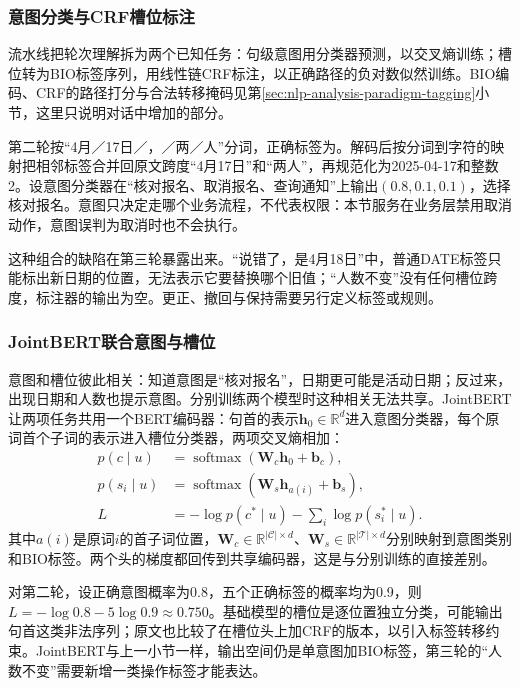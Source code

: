 \subsubsection{意图分类与CRF槽位标注}
\label{sec:nlp-dialogue-intent-crf}

流水线把轮次理解拆为两个已知任务：句级意图用分类器预测，以交叉熵训练；槽位转为BIO标签序列，用线性链CRF标注，以正确路径的负对数似然训练。BIO编码、CRF的路径打分与合法转移掩码见第\ref{sec:nlp-analysis-paradigm-tagging}小节，这里只说明对话中增加的部分。

第二轮按“4月／17日／，／两／人”分词，正确标签为。解码后按分词到字符的映射把相邻标签合并回原文跨度“4月17日”和“两人”，再规范化为2025-04-17和整数2。设意图分类器在“核对报名、取消报名、查询通知”上输出$(0.8,0.1,0.1)$，选择核对报名。意图只决定走哪个业务流程，不代表权限：本节服务在业务层禁用取消动作，意图误判为取消时也不会执行。

这种组合的缺陷在第三轮暴露出来。“说错了，是4月18日”中，普通DATE标签只能标出新日期的位置，无法表示它要替换哪个旧值；“人数不变”没有任何槽位跨度，标注器的输出为空。更正、撤回与保持需要另行定义标签或规则。

\subsubsection{JointBERT联合意图与槽位}
\label{sec:nlp-dialogue-jointbert}

意图和槽位彼此相关：知道意图是“核对报名”，日期更可能是活动日期；反过来，出现日期和人数也提示意图。分别训练两个模型时这种相关无法共享。JointBERT让两项任务共用一个BERT编码器\cite{nlp-dialogue-chen2019}：句首\code{[CLS]}的表示$\bm{h}_0\in\mathbb{R}^{d}$进入意图分类器，每个原词首个子词的表示进入槽位分类器，两项交叉熵相加：
\begin{equation}
\begin{aligned}
 p(c\mid u)&=\operatorname{softmax}(\bm{W}_{c}\bm{h}_0+\bm{b}_{c}),\\
 p(s_i\mid u)&=\operatorname{softmax}(\bm{W}_{s}\bm{h}_{a(i)}+\bm{b}_{s}),\\
 L&=-\log p(c^*\mid u)-\sum_i\log p(s_i^*\mid u).
\end{aligned}
\label{eq:nlp-dialogue-jointbert}
\end{equation}
其中$a(i)$是原词$i$的首子词位置，$\bm{W}_c\in\mathbb{R}^{|\mathcal{C}|\times d}$、$\bm{W}_s\in\mathbb{R}^{|\mathcal{T}|\times d}$分别映射到意图类别和BIO标签。两个头的梯度都回传到共享编码器，这是与分别训练的直接差别。

对第二轮，设正确意图概率为0.8，五个正确标签的概率均为0.9，则$L=-\log0.8-5\log0.9\approx0.750$。基础模型的槽位是逐位置独立分类，可能输出句首这类非法序列；原文也比较了在槽位头上加CRF的版本，以引入标签转移约束。JointBERT与上一小节一样，输出空间仍是单意图加BIO标签，第三轮的“人数不变”需要新增一类操作标签才能表达。

